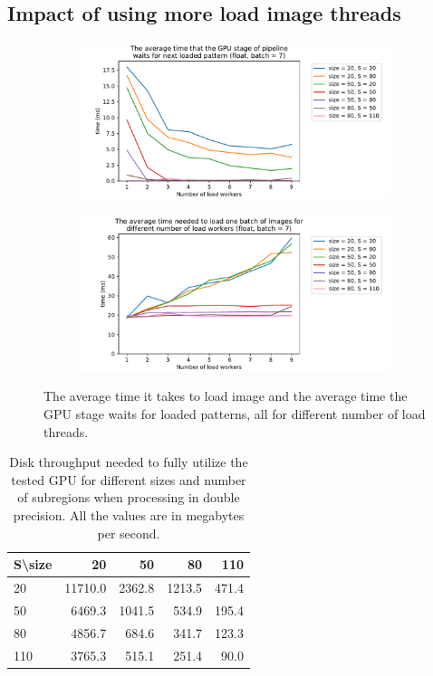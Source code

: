 \subsection{Impact of using more load image threads}
\label{load-eval-lw}

\begin{figure}
	\centering
	\begin{subfigure}{\textwidth}
		\centering
		\includegraphics[width=0.75\linewidth]{img/eval/loadworkers-offset-wait}
		\caption{}
		\label{loadworkers-offset-wait}
	\end{subfigure}
	
	\begin{subfigure}{\textwidth}
		\centering
		\includegraphics[width=0.75\linewidth]{img/eval/loadworkers-load-tiff}
		\caption{}
		\label{loadworkers-load-tiff}
	\end{subfigure}


	\caption{The average time it takes to load image and the average time the GPU stage waits for loaded patterns, all for different number of load threads.}
	\label{loadworkers}
\end{figure}

\begin{table}[]
	\centering
	\begin{tabular}{@{}l|rrrr@{}}
		S\textbackslash size &      20 &     50 &     80 &   110 \\ \midrule
		20                   & 11710.0 & 2362.8 & 1213.5 & 471.4 \\
		50                   &  6469.3 & 1041.5 &  534.9 & 195.4 \\
		80                   &  4856.7 &  684.6 &  341.7 & 123.3 \\
		110                  &  3765.3 &  515.1 &  251.4 &  90.0
	\end{tabular}
	\caption{Disk throughput needed to fully utilize the tested GPU for different sizes and number of subregions when processing in double precision. All the values are in megabytes per second.}
	\label{loadworkers-table}
\end{table}

